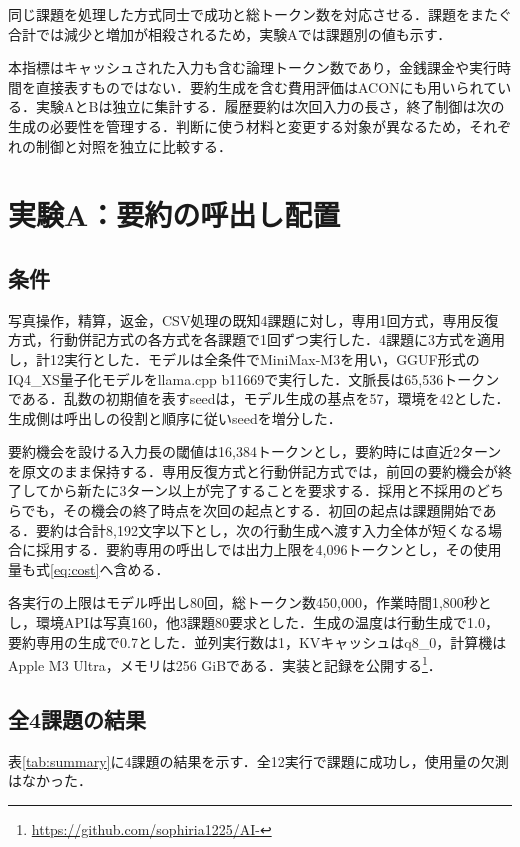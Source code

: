 \documentclass[letter]{ieicej}
\begin{document}
同じ課題を処理した方式同士で成功と総トークン数を対応させる．課題をまたぐ合計では減少と増加が相殺されるため，実験Aでは課題別の値も示す．

本指標はキャッシュされた入力も含む論理トークン数であり，金銭課金や実行時間を直接表すものではない\cite{xu2026tokenpilot}．要約生成を含む費用評価はACON\cite{kang2026acon}にも用いられている．実験AとBは独立に集計する．履歴要約は次回入力の長さ，終了制御は次の生成の必要性を管理する．判断に使う材料と変更する対象が異なるため，それぞれの制御と対照を独立に比較する．

\section{実験A：要約の呼出し配置}

\subsection{条件}

写真操作，精算，返金，CSV処理の既知4課題に対し，専用1回方式，専用反復方式，行動併記方式の各方式を各課題で1回ずつ実行した．4課題に3方式を適用し，計12実行とした．モデルは全条件でMiniMax-M3を用い，GGUF形式のIQ4\_XS量子化モデルをllama.cpp b11669で実行した．文脈長は65,536トークンである．乱数の初期値を表すseedは，モデル生成の基点を57，環境を42とした．生成側は呼出しの役割と順序に従いseedを増分した．

要約機会を設ける入力長の閾値は16,384トークンとし，要約時には直近2ターンを原文のまま保持する．専用反復方式と行動併記方式では，前回の要約機会が終了してから新たに3ターン以上が完了することを要求する．採用と不採用のどちらでも，その機会の終了時点を次回の起点とする．初回の起点は課題開始である．要約は合計8,192文字以下とし，次の行動生成へ渡す入力全体が短くなる場合に採用する．要約専用の呼出しでは出力上限を4,096トークンとし，その使用量も式\eqref{eq:cost}へ含める．

各実行の上限はモデル呼出し80回，総トークン数450,000，作業時間1,800秒とし，環境APIは写真160，他3課題80要求とした．生成の温度は行動生成で1.0，要約専用の生成で0.7とした．並列実行数は1，KVキャッシュはq8\_0，計算機はApple M3 Ultra，メモリは256 GiBである．実装と記録を公開する\footnote{\url{https://github.com/sophiria1225/AI-}}．

\subsection{全4課題の結果}

表\ref{tab:summary}に4課題の結果を示す．全12実行で課題に成功し，使用量の欠測はなかった．
\end{document}

